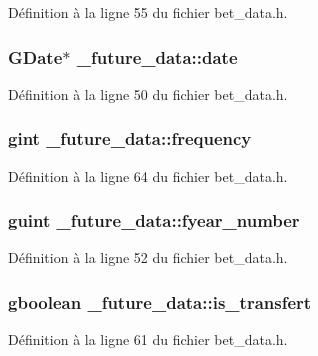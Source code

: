 Définition à la ligne 55 du fichier bet\_\-data.h.

\subsubsection[{date}]{\setlength{\rightskip}{0pt plus 5cm}GDate$\ast$ {\bf \_\-future\_\-data::date}}\label{struct__future__data_ad3244452aa5627982a643f3affeeacbc}


Définition à la ligne 50 du fichier bet\_\-data.h.

\subsubsection[{frequency}]{\setlength{\rightskip}{0pt plus 5cm}gint {\bf \_\-future\_\-data::frequency}}\label{struct__future__data_a1c0d4cbeafeac3b999d7ad486797d58f}


Définition à la ligne 64 du fichier bet\_\-data.h.

\subsubsection[{fyear\_\-number}]{\setlength{\rightskip}{0pt plus 5cm}guint {\bf \_\-future\_\-data::fyear\_\-number}}\label{struct__future__data_a7c71c9a3d9e67a1877d2bbf620a82481}


Définition à la ligne 52 du fichier bet\_\-data.h.

\subsubsection[{is\_\-transfert}]{\setlength{\rightskip}{0pt plus 5cm}gboolean {\bf \_\-future\_\-data::is\_\-transfert}}\label{struct__future__data_a74c0f6ce57c07a660f662ff785949613}


Définition à la ligne 61 du fichier bet\_\-data.h.

